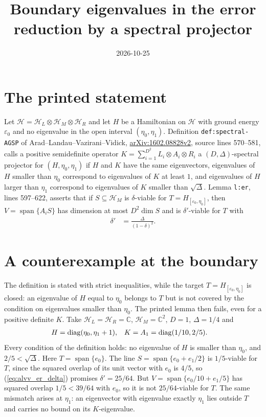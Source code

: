 \documentclass{article}
\title{Boundary eigenvalues in the error reduction by a spectral projector}
\author{}
\date{2026-10-25}
\begin{document}
\maketitle
{}

\section{The printed statement}

Let $\mathcal H=\mathcal H_L\otimes\mathcal H_M\otimes\mathcal H_R$ and let $H$
be a Hamiltonian on $\mathcal H$ with ground energy $\varepsilon_0$ and no
eigenvalue in the open interval $(\eta_0,\eta_1)$. Definition
\texttt{def:spectral-AGSP} of Arad--Landau--Vazirani--Vidick,
\href{https://arxiv.org/abs/1602.08828}{arXiv:1602.08828v2}, source lines
570--581, calls a positive semidefinite operator
$K=\sum_{i=1}^{D^2}L_i\otimes A_i\otimes R_i$ a $(D,\Delta)$-spectral
projector for $(H,\eta_0,\eta_1)$ if $H$ and $K$ have the same eigenvectors,
eigenvalues of $H$ smaller than $\eta_0$ correspond to eigenvalues of $K$ at
least $1$, and eigenvalues of $H$ larger than $\eta_1$ correspond to
eigenvalues of $K$ smaller than $\sqrt\Delta$. Lemma \texttt{l:er}, lines
597--622, asserts that if $S\subseteq\mathcal H_M$ is $\delta$-viable for
$T=H_{[\varepsilon_0,\eta_0]}$, then
$V=\operatorname{span}\{A_iS\}$ has dimension at most $D^2\dim S$ and is
$\delta'$-viable for $T$ with
\begin{align}
    \delta'&=\frac{\Delta}{(1-\delta)^2}.
    \label{eq:alvv_er_delta}
\end{align}

\section{A counterexample at the boundary}

The definition is stated with strict inequalities, while the target
$T=H_{[\varepsilon_0,\eta_0]}$ is closed: an eigenvalue of $H$ equal to
$\eta_0$ belongs to $T$ but is not covered by the condition on eigenvalues
smaller than $\eta_0$. The printed lemma then fails, even for a positive
definite $K$. Take $\mathcal H_L=\mathcal H_R=\mathbb C$,
$\mathcal H_M=\mathbb C^2$, $D=1$, $\Delta=1/4$ and
\begin{align}
    H&=\operatorname{diag}(\eta_0,\eta_1+1),&
    K=A_1&=\operatorname{diag}(1/10,2/5).\notag
\end{align}
Every condition of the definition holds: no eigenvalue of $H$ is smaller
than $\eta_0$, and $2/5<\sqrt\Delta$. Here $T=\operatorname{span}\{e_0\}$.
The line $S=\operatorname{span}\{e_0+e_1/2\}$ is $1/5$-viable for $T$, since
the squared overlap of its unit vector with $e_0$ is $4/5$, so
(\ref{eq:alvv_er_delta}) promises $\delta'=25/64$. But
$V=\operatorname{span}\{e_0/10+e_1/5\}$ has squared overlap $1/5<39/64$
with $e_0$, so it is not $25/64$-viable for $T$. The same mismatch arises at
$\eta_1$: an eigenvector with eigenvalue exactly $\eta_1$ lies outside $T$
and carries no bound on its $K$-eigenvalue.
\end{document}
